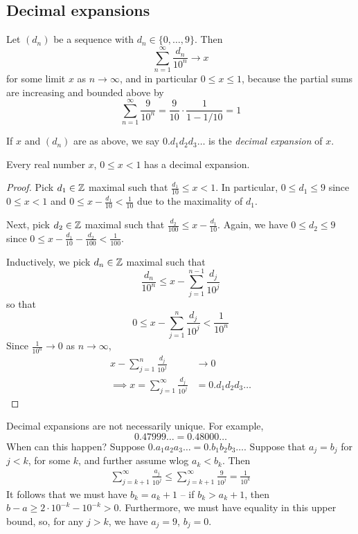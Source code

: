 \documentclass{../template/note}
\begin{document}
    \subsection{Decimal expansions}

    Let \((d_n)\) be a sequence with \(d_n \in \{0, \dots, 9\}\). Then
    \[
        \sum_{n=1}^\infty \frac{d_n}{10^n} \to x
    \]
    for some limit \(x\) as \(n \to \infty\), and in particular \(0 \leq x \leq 1\), because the partial sums are increasing and bounded above by
    \[
        \sum_{n=1}^\infty \frac{9}{10^n} = \frac{9}{10} \cdot \frac{1}{1-1/10} = 1
    \]

    \begin{definition}
        If \(x\) and \((d_n)\) are as above, we say \(0.d_1d_2d_3\dots\) is the \emph{decimal expansion} of \(x\).
    \end{definition}

    \begin{proposition}
        Every real number \(x\), \(0 \leq x < 1\) has a decimal expansion.
    \end{proposition}
    
    \begin{proof}
        Pick \(d_1 \in \mathbb Z\) maximal such that \(\frac{d_1}{10} \leq x < 1\). In particular, \(0 \leq d_1 \leq 9\) since \(0 \leq x < 1\) and \(0 \leq x - \frac{d_1}{10} < \frac{1}{10}\) due to the maximality of \(d_1\).

        Next, pick \(d_2 \in \mathbb Z\) maximal such that \(\frac{d_2}{100} \leq x - \frac{d_1}{10}\). Again, we have \(0 \leq d_2 \leq 9\) since \(0 \leq x - \frac{d_1}{10} - \frac{d_2}{100} < \frac 1 {100}\).

        Inductively, we pick \(d_n \in \mathbb Z\) maximal such that
        \[
            \frac{d_n}{10^n} \leq x - \sum_{j=1}^{n-1} \frac{d_j}{10^j}
        \]
        so that
        \[
            0 \leq x - \sum_{j=1}^{n} \frac{d_j}{10^j} < \frac 1 {10^n}
        \]
        Since \(\frac{1}{10^n} \to 0\) as \(n \to \infty\),
        \begin{align*}
            x - \sum_{j=1}^n \frac{d_j}{10^j} &\to 0 \\
            \implies x = \sum_{j=1}^\infty \frac{d_j}{10^j} &= 0.d_1d_2d_3 \dots
        \end{align*}
    \end{proof}
    Decimal expansions are not necessarily unique. For example,
    \[
        0.47999\dots = 0.48000\dots
    \]
    When can this happen? Suppose \(0.a_1a_2a_3 \dots = 0.b_1b_2b_3 \dots\). Suppose that \(a_j = b_j\) for \(j < k\), for some \(k\), and further assume wlog \(a_k < b_k\). Then
    \begin{align*}
        \sum_{j=k+1}^\infty \frac{a_j}{10^j} \leq \sum_{j=k+1}^\infty \frac{9}{10^j} = \frac{1}{10^k}
    \end{align*}
    It follows that we must have \(b_k = a_k + 1\) -- if \(b_k > a_k+1\), then \(b-a \geq 2\cdot 10^{-k} - 10^{-k} > 0\). Furthermore, we must have equality in this upper bound, so, for any \(j > k\), we have \(a_j = 9\), \(b_j = 0\).
    
\end{document}

